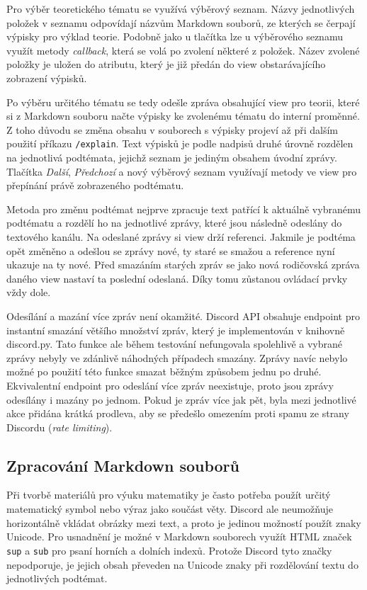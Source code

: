 \documentclass[FM]{tulthesis}
\begin{document}
	Pro výběr teoretického tématu se využívá výběrový seznam. Názvy jednotlivých položek v seznamu odpovídají názvům Markdown souborů, ze kterých se čerpají výpisky pro výklad teorie. Podobně jako u tlačítka lze u výběrového seznamu využít metody \textit{callback}, která se volá po zvolení některé z položek. Název zvolené položky je uložen do atributu, který je již předán do view obstarávajícího zobrazení výpisků.%
	
	Po výběru určitého tématu se tedy odešle zpráva obsahující view pro teorii, které si z Markdown souboru načte výpisky ke zvolenému tématu do interní proměnné. Z toho důvodu se změna obsahu v souborech s výpisky projeví až při dalším použití příkazu \verb|/explain|. Text výpisků je podle nadpisů druhé úrovně rozdělen na jednotlivá podtémata, jejichž seznam je jediným obsahem úvodní zprávy. Tlačítka \textit{Další}, \textit{Předchozí} a nový výběrový seznam využívají metody ve view pro přepínání právě zobrazeného podtématu.
	
	Metoda pro změnu podtémat nejprve zpracuje text patřící k aktuálně vybranému podtématu a rozdělí ho na jednotlivé zprávy, které jsou následně odeslány do textového kanálu. Na odeslané zprávy si view drží referenci. Jakmile je podtéma opět změněno a odešlou se zprávy nové, ty staré se smažou a reference nyní ukazuje na ty nové. Před smazáním starých zpráv se jako nová rodičovská zpráva daného view nastaví ta poslední odeslaná. Díky tomu zůstanou ovládací prvky vždy dole.
	
	Odesílání a mazání více zpráv není okamžité. Discord API obsahuje endpoint pro instantní smazání většího množství zpráv, který je implementován v knihovně discord.py. Tato funkce ale během testování nefungovala spolehlivě a vybrané zprávy nebyly ve zdánlivě náhodných případech smazány. Zprávy navíc nebylo možné po použití této funkce smazat běžným způsobem jednu po druhé. Ekvivalentní endpoint pro odeslání více zpráv neexistuje, proto jsou zprávy odesílány i mazány po jednom. Pokud je zpráv více jak pět, byla mezi jednotlivé akce přidána krátká prodleva, aby se předešlo omezením proti spamu ze strany Discordu (\textit{rate limiting}).
		
	
	\subsection{Zpracování Markdown souborů}
	
	Při tvorbě materiálů pro výuku matematiky je často potřeba použít určitý matematický symbol nebo výraz jako součást věty. Discord ale neumožňuje horizontálně vkládat obrázky mezi text, a proto je jedinou možností použít znaky Unicode. Pro usnadnění je možné v Markdown souborech využít HTML značek \verb|sup| a \verb|sub| pro psaní horních a dolních indexů. Protože Discord tyto značky nepodporuje, je jejich obsah převeden na Unicode znaky při rozdělování textu do jednotlivých podtémat.
	
\end{document}

